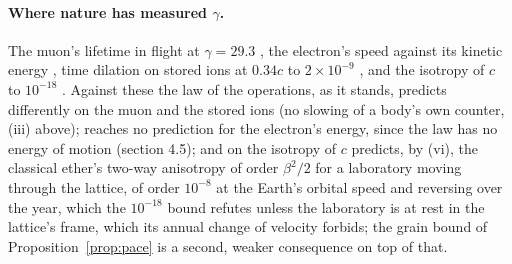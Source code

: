 \documentclass[11pt]{article}
\theoremstyle{definition}
\begin{document}
\paragraph{Where nature has measured $\gamma$.} The muon's lifetime in
flight at $\gamma = 29.3$ \cite{bailey1977}, the electron's speed against
its kinetic energy \cite{bertozzi1964}, time dilation on stored ions at
$0.34c$ to $2 \times 10^{-9}$ \cite{botermann2014}, and the isotropy of
$c$ to $10^{-18}$ \cite{nagel2015}. Against these the law of the
operations, as it stands, predicts differently on the muon and the stored
ions (no slowing of a body's own counter, (iii) above); reaches no
prediction for the electron's energy, since the law has no energy of
motion (section 4.5); and on the isotropy of $c$ predicts, by (vi), the
classical ether's two-way anisotropy of order $\beta^2/2$ for a
laboratory moving through the lattice, of order $10^{-8}$ at the Earth's
orbital speed and reversing over the year, which the $10^{-18}$ bound
refutes unless the laboratory is at rest in the lattice's frame, which
its annual change of velocity forbids; the grain bound of
Proposition~\ref{prop:pace} is a second, weaker consequence on top of
that.
\end{document}
